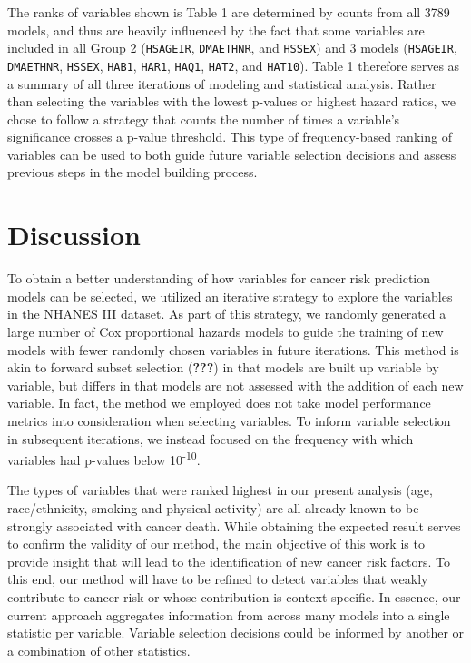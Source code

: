 \documentclass[12pt,twoside]{reedthesis}
\theoremstyle{definition}
\theoremstyle{definition}
\theoremstyle{definition}
\theoremstyle{remark}
\begin{document}
The ranks of variables shown is Table 1 are determined by counts from
all 3789 models, and thus are heavily influenced by the fact that some
variables are included in all Group 2 (\texttt{HSAGEIR},
\texttt{DMAETHNR}, and \texttt{HSSEX}) and 3 models (\texttt{HSAGEIR},
\texttt{DMAETHNR}, \texttt{HSSEX}, \texttt{HAB1}, \texttt{HAR1},
\texttt{HAQ1}, \texttt{HAT2}, and \texttt{HAT10}). Table 1 therefore
serves as a summary of all three iterations of modeling and statistical
analysis. Rather than selecting the variables with the lowest p-values
or highest hazard ratios, we chose to follow a strategy that counts the
number of times a variable's significance crosses a p-value threshold.
This type of frequency-based ranking of variables can be used to both
guide future variable selection decisions and assess previous steps in
the model building process.

\hypertarget{discussion}{%
\section{Discussion}\label{discussion}}

To obtain a better understanding of how variables for cancer risk
prediction models can be selected, we utilized an iterative strategy to
explore the variables in the NHANES III dataset. As part of this
strategy, we randomly generated a large number of Cox proportional
hazards models to guide the training of new models with fewer randomly
chosen variables in future iterations. This method is akin to forward
subset selection ({\textbf{???}}) in that models are built up variable
by variable, but differs in that models are not assessed with the
addition of each new variable. In fact, the method we employed does not
take model performance metrics into consideration when selecting
variables. To inform variable selection in subsequent iterations, we
instead focused on the frequency with which variables had p-values below
10\textsuperscript{-10}.

The types of variables that were ranked highest in our present analysis
(age, race/ethnicity, smoking and physical activity) are all already
known to be strongly associated with cancer death. While obtaining the
expected result serves to confirm the validity of our method, the main
objective of this work is to provide insight that will lead to the
identification of new cancer risk factors. To this end, our method will
have to be refined to detect variables that weakly contribute to cancer
risk or whose contribution is context-specific. In essence, our current
approach aggregates information from across many models into a single
statistic per variable. Variable selection decisions could be informed
by another or a combination of other statistics.
\end{document}
